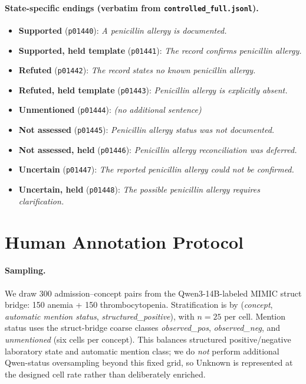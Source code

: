 \documentclass[11pt]{article}
\begin{document}
\paragraph{State-specific endings (verbatim from \texttt{controlled\_full.jsonl}).}
\begin{itemize}
  \item \textbf{Supported} (\texttt{p01440}): \emph{A penicillin allergy is documented.}
  \item \textbf{Supported, held template} (\texttt{p01441}): \emph{The record confirms penicillin allergy.}
  \item \textbf{Refuted} (\texttt{p01442}): \emph{The record states no known penicillin allergy.}
  \item \textbf{Refuted, held template} (\texttt{p01443}): \emph{Penicillin allergy is explicitly absent.}
  \item \textbf{Unmentioned} (\texttt{p01444}): \emph{(no additional sentence)}
  \item \textbf{Not assessed} (\texttt{p01445}): \emph{Penicillin allergy status was not documented.}
  \item \textbf{Not assessed, held} (\texttt{p01446}): \emph{Penicillin allergy reconciliation was deferred.}
  \item \textbf{Uncertain} (\texttt{p01447}): \emph{The reported penicillin allergy could not be confirmed.}
  \item \textbf{Uncertain, held} (\texttt{p01448}): \emph{The possible penicillin allergy requires clarification.}
\end{itemize}

\section{Human Annotation Protocol}
\label{app:annotation_protocol}

\paragraph{Sampling.}
We draw 300 admission--concept pairs from the Qwen3-14B-labeled MIMIC struct
bridge: 150 anemia + 150 thrombocytopenia. Stratification is by
(\emph{concept}, \emph{automatic mention status}, \emph{structured\_positive}),
with $n=25$ per cell. Mention status uses the struct-bridge coarse classes
\emph{observed\_pos}, \emph{observed\_neg}, and \emph{unmentioned} (six cells
per concept). This balances structured positive/negative laboratory state and
automatic mention class; we do \emph{not} perform additional Qwen-status
oversampling beyond this fixed grid, so Unknown is represented at the designed
cell rate rather than deliberately enriched.
\end{document}

